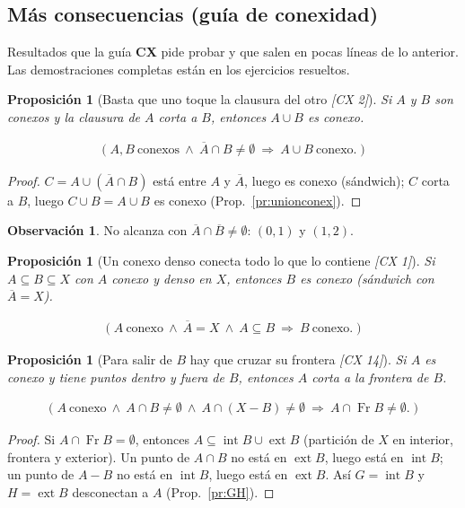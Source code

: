 \documentclass[11pt,a4paper]{article}
\newcommand{\lgc}[1]{\par\vspace{-3pt}\begin{gather*}\big(\;#1\;\big)\end{gather*}\vspace{-6pt}}
\theoremstyle{definition}
\newtheorem{observacion}[definicion]{Observación}
\theoremstyle{plain}
\newtheorem{proposicion}[definicion]{Proposición}
\newcommand{\fnt}[1]{{\normalfont\small\itshape\color{gray!150!black}[#1]}}
\newcommand{\cl}[1]{\overline{#1}}
\newcommand{\intr}{\operatorname{int}}
\newcommand{\fr}{\operatorname{Fr}}
\newcommand{\ext}{\operatorname{ext}}
\begin{document}
\subsection{Más consecuencias (guía de conexidad)}

\noindent Resultados que la guía \textbf{CX} pide probar y que salen en pocas líneas de lo anterior. Las demostraciones completas están en los ejercicios resueltos.

\begin{proposicion}[Basta que uno toque la clausura del otro \fnt{CX 2}]\label{pr:clunion}
Si $A$ y $B$ son conexos y la clausura de $A$ corta a $B$, entonces $A\cup B$ es conexo.
\lgc{A,B\ \text{conexos}\ \wedge\ \cl A\cap B\ne\emptyset\ \Rightarrow\ A\cup B\ \text{conexo}.}
\end{proposicion}

\begin{proof}
$C=A\cup(\cl A\cap B)$ está entre $A$ y $\cl A$, luego es conexo (sándwich); $C$ corta a $B$, luego $C\cup B=A\cup B$ es conexo (Prop.~\ref{pr:unionconex}).
\end{proof}

\begin{observacion}
No alcanza con $\cl A\cap\cl B\ne\emptyset$: $(0,1)$ y $(1,2)$.
\end{observacion}

\begin{proposicion}[Un conexo denso conecta todo lo que lo contiene \fnt{CX 1}]
Si $A\subseteq B\subseteq X$ con $A$ conexo y denso en $X$, entonces $B$ es conexo (sándwich con $\cl A=X$).
\lgc{A\ \text{conexo}\ \wedge\ \cl A=X\ \wedge\ A\subseteq B\ \Rightarrow\ B\ \text{conexo}.}
\end{proposicion}

\begin{proposicion}[Para salir de $B$ hay que cruzar su frontera \fnt{CX 14}]\label{pr:cruzafr}
Si $A$ es conexo y tiene puntos dentro y fuera de $B$, entonces $A$ corta a la frontera de $B$.
\lgc{A\ \text{conexo}\ \wedge\ A\cap B\ne\emptyset\ \wedge\ A\cap(X-B)\ne\emptyset\ \Rightarrow\ A\cap\fr B\ne\emptyset.}
\end{proposicion}

\begin{proof}
Si $A\cap\fr B=\emptyset$, entonces $A\subseteq\intr B\cup\ext B$ (partición de $X$ en interior, frontera y exterior). Un punto de $A\cap B$ no está en $\ext B$, luego está en $\intr B$; un punto de $A-B$ no está en $\intr B$, luego está en $\ext B$. Así $G=\intr B$ y $H=\ext B$ desconectan a $A$ (Prop.~\ref{pr:GH}).
\end{proof}
\end{document}
